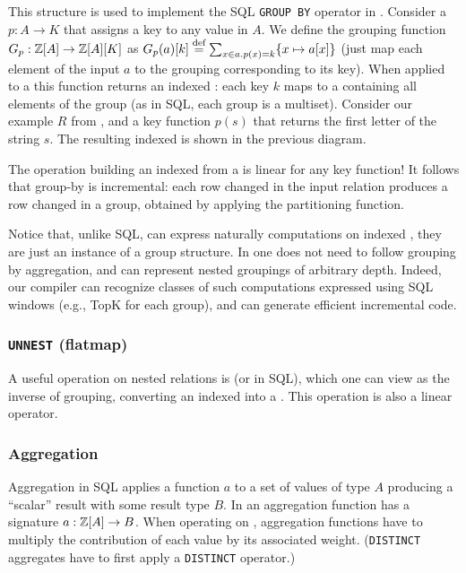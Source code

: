 This structure is used to implement the SQL \texttt{GROUP BY} operator
in \dbsp.  Consider a  $p: A \to K$
that assigns a key to any value in $A$.  We define the grouping
function $G_p: \mathbb{Z}[A] \to \mathbb{Z}[A][K]$ as $G_p(a)[k] \stackrel{\textrm{\scriptsize def}}{=} \sum_{x \in
  a.p(x)=k}\{ x \mapsto a[x] \}$ (just map each element of the input
$a$ to the \zr grouping corresponding to its key).  When applied to a
\zr this function returns an indexed \zr: each key $k$ maps to a \zr
containing all elements of the group (as in SQL, each group is a
multiset).  Consider our example \zr $R$ from ,
and a key function $p(s)$ that returns the first letter of the string
$s$.  The resulting indexed \zr is shown in the previous diagram.

The operation building an indexed \zr from a \zr is linear for any key
function!  It follows that group-by is incremental: each row changed
in the input relation produces a row changed in a group, obtained by
applying the partitioning function.

Notice that, unlike SQL, \dbsp can express naturally computations on
indexed \zrs, they are just an instance of a group structure.  In
\dbsp one does not need to follow grouping by aggregation, and \dbsp
can represent nested groupings of arbitrary depth.  Indeed, our
compiler can recognize classes of such computations expressed using
SQL windows (e.g., TopK for each group), and can generate efficient
incremental code.


\subsubsection{\texttt{UNNEST} (flatmap)}

A useful operation on nested relations is  (or
 in SQL), which one can view as the inverse of grouping,
converting an indexed \zr into a \zr.  This operation is also a linear
\dbsp operator.

\subsubsection{Aggregation}\label{sec:aggregation}

Aggregation in SQL applies a function $a$ to a set of values of type
$A$ producing a ``scalar'' result with some result type $B$.  In \dbsp
an aggregation function has a signature $a: \mathbb{Z}[A] \to B$.  When
operating on \zrs, aggregation functions have to multiply the
contribution of each value by its associated weight.
(\texttt{DISTINCT} aggregates have to first apply a \texttt{DISTINCT}
operator.)

